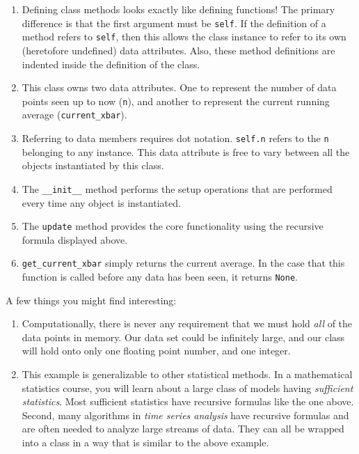\documentclass[
  12pt,
  krantz2]{krantz}
\begin{document}
\begin{enumerate}
\def\labelenumi{\arabic{enumi}.}
\item
  Defining class methods looks exactly like defining functions! The primary difference is that the first argument must be \texttt{self}. If the definition of a method refers to \texttt{self}, then this allows the class instance to refer to its own (heretofore undefined) data attributes. Also, these method definitions are indented inside the definition of the class.
\item
  This class owns two data attributes. One to represent the number of data points seen up to now (\texttt{n}), and another to represent the current running average (\texttt{current\_xbar}).
\item
  Referring to data members requires dot notation. \texttt{self.n} refers to the \texttt{n} belonging to any instance. This data attribute is free to vary between all the objects instantiated by this class.
\item
  The \texttt{\_\_init\_\_} method performs the setup operations that are performed every time any object is instantiated.
\item
  The \texttt{update} method provides the core functionality using the recursive formula displayed above.
\item
  \texttt{get\_current\_xbar} simply returns the current average. In the case that this function is called before any data has been seen, it returns \texttt{None}.
\end{enumerate}

A few things you might find interesting:

\begin{enumerate}
\def\labelenumi{\roman{enumi}.}
\item
  Computationally, there is never any requirement that we must hold \emph{all} of the data points in memory. Our data set could be infinitely large, and our class will hold onto only one floating point number, and one integer.
\item
  This example is generalizable to other statistical methods. In a mathematical statistics course, you will learn about a large class of models having \emph{sufficient statistics}. Most sufficient statistics have recursive formulas like the one above. Second, many algorithms in \emph{time series analysis} have recursive formulas and are often needed to analyze large streams of data. They can all be wrapped into a class in a way that is similar to the above example.
\end{enumerate}
\end{document}
